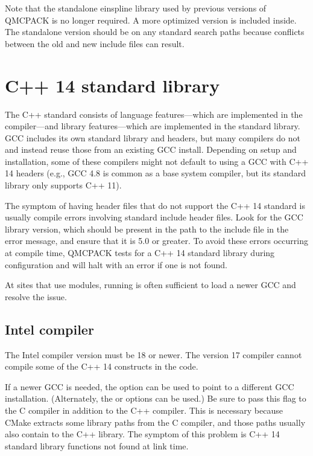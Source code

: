 \documentclass[letterpaper,10pt,english]{sphinxmanual}
\begin{document}
Note that the standalone einspline library used by previous versions of
QMCPACK is no longer required. A more optimized version is included
inside. The standalone version should  be on any standard search
paths because conflicts between the old and new include files can
result.


\section{C++ 14 standard library}
\label{\detokenize{installation:c-14-standard-library}}
The C++ standard consists of language features—which are implemented in
the compiler—and library features—which are implemented in the standard
library. GCC includes its own standard library and headers, but many
compilers do not and instead reuse those from an existing GCC install.
Depending on setup and installation, some of these compilers might not
default to using a GCC with C++ 14 headers (e.g., GCC 4.8 is common as a
base system compiler, but its standard library only supports C++ 11).

The symptom of having header files that do not support the C++ 14
standard is usually compile errors involving standard include header
files. Look for the GCC library version, which should be present in the
path to the include file in the error message, and ensure that it is 5.0
or greater. To avoid these errors occurring at compile time, QMCPACK
tests for a C++ 14 standard library during configuration and will halt
with an error if one is not found.

At sites that use modules, running is often sufficient to load a newer
GCC and resolve the issue.


\subsection{Intel compiler}
\label{\detokenize{installation:intel-compiler}}
The Intel compiler version must be 18 or newer. The version 17 compiler
cannot compile some of the C++ 14 constructs in the code.

If a newer GCC is needed, the  option can be used to point to a different
GCC installation. (Alternately, the  or  options can be used.) Be sure to
pass this flag to the C compiler in addition to the C++ compiler. This
is necessary because CMake extracts some library paths from the C
compiler, and those paths usually also contain to the C++ library. The
symptom of this problem is C++ 14 standard library functions not found
at link time.
\end{document}
